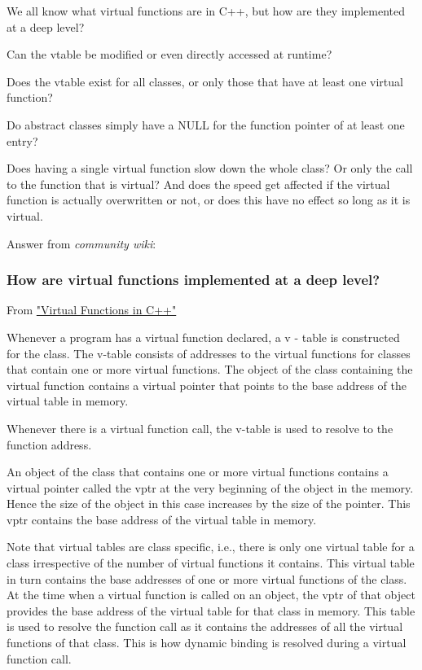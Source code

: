\documentclass[10pt]{amsart}
\begin{document}
\begin{multicols*}{2}
We all know what virtual functions are in C++, but how are they implemented at a deep level?

Can the vtable be modified or even directly accessed at runtime?

Does the vtable exist for all classes, or only those that have at least one virtual function?

Do abstract classes simply have a NULL for the function pointer of at least one entry?

Does having a single virtual function slow down the whole class? Or only the call to the function that is virtual? And does the speed get affected if the virtual function is actually overwritten or not, or does this have no effect so long as it is virtual.

Answer from \emph{community wiki}:  

\subsubsection{How are virtual functions implemented at a deep level?}

From \href{http://wayback.archive.org/web/20100209040010/http://www.codersource.net/published/view/325/virtual_functions_in.aspx}{"Virtual Functions in C++"}

Whenever a program has a virtual function declared, a v - table is constructed for the class. The v-table consists of addresses to the virtual functions for classes that contain one or more virtual functions. The object of the class containing the virtual function contains a virtual pointer that points to the base address of the virtual table in memory.  

Whenever there is a virtual function call, the v-table is used to resolve to the function address.  

An object of the class that contains one or more virtual functions contains a virtual pointer called the vptr at the very beginning of the object in the memory. Hence the size of the object in this case increases by the size of the pointer. This vptr contains the base address of the virtual table in memory.  

Note that virtual tables are class specific, i.e., there is only one virtual table for a class irrespective of the number of virtual functions it contains. This virtual table in turn contains the base addresses of one or more virtual functions of the class. At the time when a virtual function is called on an object, the vptr of that object provides the base address of the virtual table for that class in memory. This table is used to resolve the function call as it contains the addresses of all the virtual functions of that class. This is how dynamic binding is resolved during a virtual function call.


\end{multicols*}
\end{document}
